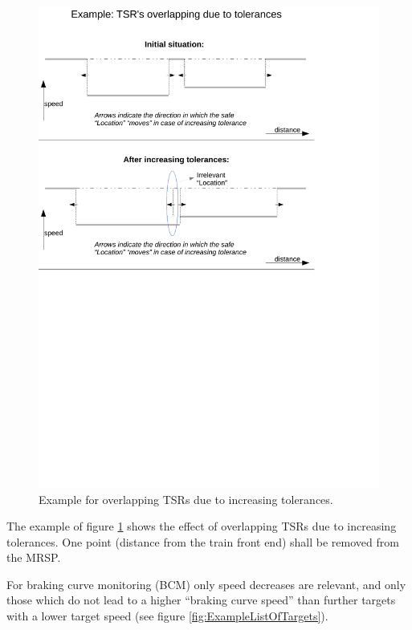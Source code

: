 \begin{figure}[ht]
\centering
\includegraphics[trim = 0mm 130mm 0mm 0mm, scale=0.6]{../images/MRSPExample_TRSsOverlapping.pdf}
\caption{Example for overlapping TSRs due to increasing tolerances.}\label{fig:TSRoverlapping}
\end{figure}

The example of figure \ref{fig:TSRoverlapping} shows the effect of overlapping TSRs due to increasing tolerances. One point (distance from the train front end) shall be removed from the MRSP. 

For braking curve monitoring (BCM) only speed decreases are relevant, and only those which do not lead to a higher “braking curve speed” than further targets with a lower target speed (see figure \ref{fig:ExampleListOfTargets}).


